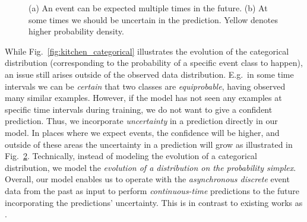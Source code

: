 \begin{figure}
\begin{subfigure}{.4 \linewidth}
                \vspace*{-0.6cm}
                \caption{}
                \label{fig:kitchen_uncertainty}
        \end{subfigure}
        \caption{(a) An event can be expected multiple times in the future. (b) At some times we should be uncertain in the prediction. Yellow denotes higher probability density.}
\end{figure}
While Fig.\ \ref{fig:kitchen_categorical} illustrates the evolution of the categorical distribution (corresponding to the probability of a specific event class to happen), an issue still arises outside of the observed data distribution. {E.g.\ in some time intervals we can be \textit{certain} that two classes are \textit{equiprobable}, having observed many similar examples. However,} if the model has not seen any examples at specific time intervals during training, we do not want to give a confident prediction. Thus, we incorporate \textit{uncertainty} in a prediction directly in our model. In places where we expect events, the confidence will be higher, and outside of these areas the uncertainty in a prediction will grow as illustrated in Fig.\ \ref{fig:kitchen_uncertainty}. Technically, instead of modeling the evolution of a categorical distribution, we model the \textit{evolution of a distribution on the probability simplex}.
%
Overall, our model enables us to operate with the \textit{asynchronous discrete} event data from the past as input to perform \textit{continuous-time} predictions to the future incorporating the predictions' uncertainty. This is in contrast to existing works as \cite{RMTPP, hawkes}.
